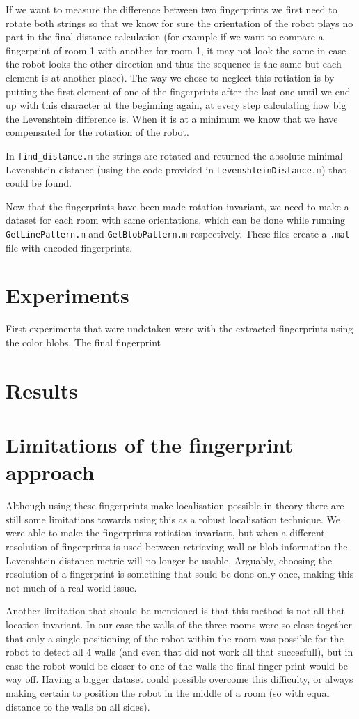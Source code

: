 \documentclass[a4paper, 20pt]{article}
\begin{document}
If we want to measure the difference between two fingerprints we first need to
rotate both strings so that we know for sure the orientation of the robot plays
no part in the final distance calculation (for example if we want to compare a
fingerprint of room 1 with another for room 1, it may not look the same in case
the robot looks the other direction and thus the sequence is the same but each
element is at another place). The way we chose to neglect this rotiation is by
putting the first element of one of the fingerprints after the last one until we
end up with this character at the beginning again, at every step calculating how
big the Levenshtein difference is. When it is at a minimum we know that we have
compensated for the rotiation of the robot.

In \texttt{find\_distance.m} the strings are rotated and returned the absolute minimal
Levenshtein distance (using the code provided in \texttt{LevenshteinDistance.m}) that could be found.

Now that the fingerprints have been made rotation invariant, we need to make a
dataset for each room with same orientations, which can be done while running
\texttt{GetLinePattern.m} and \texttt{GetBlobPattern.m} respectively. These
files create a \texttt{.mat} file with encoded fingerprints.



\section{Experiments}
First experiments that were undetaken were with the extracted fingerprints using
the color blobs. The final fingerprint 


\section{Results}

\section{Limitations of the fingerprint approach}
Although using these fingerprints make localisation possible in theory there are
still some limitations towards using this as a robust localisation technique. We
were able to make the fingerprints rotiation invariant, but when a different
resolution of fingerprints is used between retrieving wall or blob information
the Levenshtein distance metric will no longer be usable. Arguably, choosing the
resolution of a fingerprint is something that sould be done only once, making
this not much of a real world issue.

Another limitation that should be mentioned is that this method is not all that
location invariant. In our case the walls of the three rooms were so close
together that only a single positioning of the robot within the room was
possible for the robot to detect all 4 walls (and even that did not work all
that succesfull), but in case the robot would be closer to one of the walls the
final finger print would be way off. Having a bigger dataset could possible
overcome this difficulty, or always making certain to position the robot  in the
middle of a room (so with equal distance to the walls on all sides).
\end{document}
